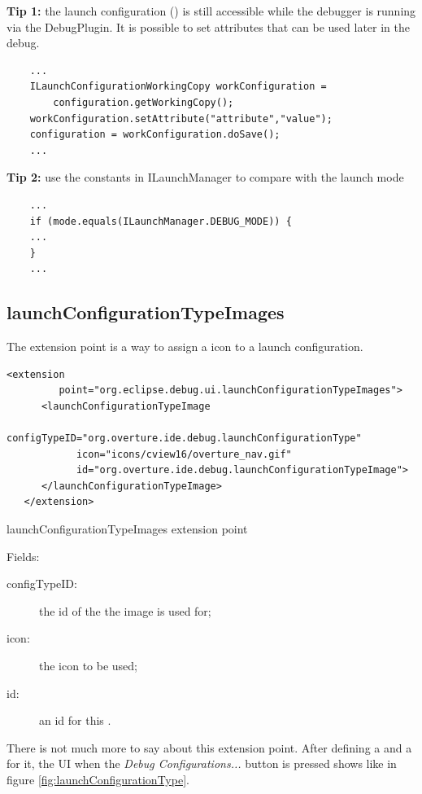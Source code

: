 \textbf{Tip 1:} the launch configuration () is still accessible while the debugger is running via the DebugPlugin. It is possible to set attributes that can be used later in the debug.
\begin{lstlisting}
	...
	ILaunchConfigurationWorkingCopy workConfiguration = 
		configuration.getWorkingCopy();		
	workConfiguration.setAttribute("attribute","value");
	configuration = workConfiguration.doSave();
	...
\end{lstlisting}

\textbf{Tip 2:} use the constants in ILaunchManager to compare with the launch mode
\begin{lstlisting}
	...
	if (mode.equals(ILaunchManager.DEBUG_MODE)) {
	...
	}
	...
\end{lstlisting}



\subsection{launchConfigurationTypeImages}
The  extension point is a way to assign a icon to a launch configuration.

\begin{program}
\scriptsize
\begin{verbatim}
<extension
         point="org.eclipse.debug.ui.launchConfigurationTypeImages">
      <launchConfigurationTypeImage
            configTypeID="org.overture.ide.debug.launchConfigurationType"
            icon="icons/cview16/overture_nav.gif"
            id="org.overture.ide.debug.launchConfigurationTypeImage">
      </launchConfigurationTypeImage>
   </extension>
\end{verbatim}
\caption{launchConfigurationTypeImages extension point}
\normalsize
\end{program}

Fields:
\begin{description}
\item[configTypeID:] the id of the  the image is used for;
\item[icon:] the icon to be used;
\item[id:] an id for this .
\end{description}

There is not much more to say about this extension point. After defining a  and a   for it, the UI when the \textit{Debug Configurations...} button is pressed shows like in figure \ref{fig:launchConfigurationType}.

